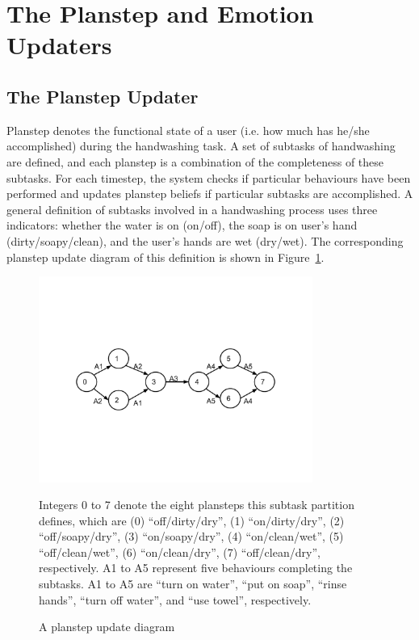 \section{The Planstep and Emotion Updaters}
\label{sec:design-updater}
\subsection{The Planstep Updater}

Planstep denotes the functional state of a user (i.e. how much has he/she accomplished) during the handwashing task. A set of subtasks of handwashing are defined, and each planstep is a combination of the completeness of these subtasks. For each timestep, the system checks if particular behaviours have been performed and updates planstep beliefs if particular subtasks are accomplished. A general definition of subtasks involved in a handwashing process uses three indicators: whether the water is on (on/off), the soap is on user's hand (dirty/soapy/clean), and the user's hands are wet (dry/wet). The corresponding planstep update diagram of this definition is shown in Figure~\ref{fig:planstep}.

\begin{figure}[htp]
\centering
\includegraphics[trim = 20mm 50mm 20mm 50mm, clip, width=0.8\textwidth]{fig/fig-planstep.pdf}
\caption{A planstep update diagram}
\vspace*{2mm}
\parbox{0.85\linewidth}{Integers 0 to 7 denote the eight plansteps this subtask partition defines, which are (0) ``off/dirty/dry'', (1) ``on/dirty/dry'', (2) ``off/soapy/dry'', (3) ``on/soapy/dry'', (4) ``on/clean/wet'', (5) ``off/clean/wet'', (6) ``on/clean/dry'', (7) ``off/clean/dry'', respectively. A1 to A5 represent five behaviours completing the subtasks. A1 to A5 are ``turn on water'', ``put on soap'', ``rinse hands'', ``turn off water'', and ``use towel'', respectively.}
\label{fig:planstep}
\end{figure}

